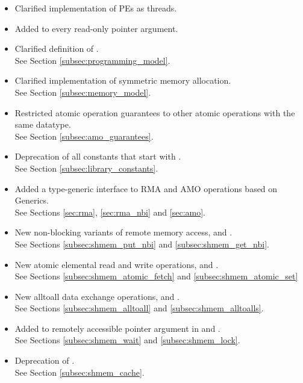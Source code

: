 \begin{itemize}
%
\item Clarified implementation of \acp{PE} as threads.
%
\item Added  to every read-only pointer argument.
%
\item Clarified definition of .
\\See Section \ref{subsec:programming_model}.
%
\item Clarified implementation of symmetric memory allocation.
\\See Section \ref{subsec:memory_model}.
%
\item Restricted atomic operation guarantees to other atomic operations with the same datatype.
\\See Section \ref{subsec:amo_guarantees}.
%
\item Deprecation of all constants that start with .
\\See Section \ref{subsec:library_constants}.
%
\item Added a type-generic interface to \openshmem \ac{RMA} and \ac{AMO}
	operations based on \Cstd[11] Generics.
\\See Sections \ref{sec:rma}, \ref{sec:rma_nbi} and \ref{sec:amo}.
%
\item New non-blocking variants of remote memory access, 
	and .
\\See Sections \ref{subsec:shmem_put_nbi} and \ref{subsec:shmem_get_nbi}.
%
\item New atomic elemental read and write operations,  and
	.
\\See Sections \ref{subsec:shmem_atomic_fetch} and \ref{subsec:shmem_atomic_set}
%
\item New alltoall data exchange operations,  
	and .
\\See Sections \ref{subsec:shmem_alltoall} and \ref{subsec:shmem_alltoalls}.
%
\item Added  to remotely accessible pointer argument in
	 and .
\\See Sections \ref{subsec:shmem_wait} and \ref{subsec:shmem_lock}.
%
\item Deprecation of .
\\See Section \ref{subsec:shmem_cache}.
%
\end{itemize}




